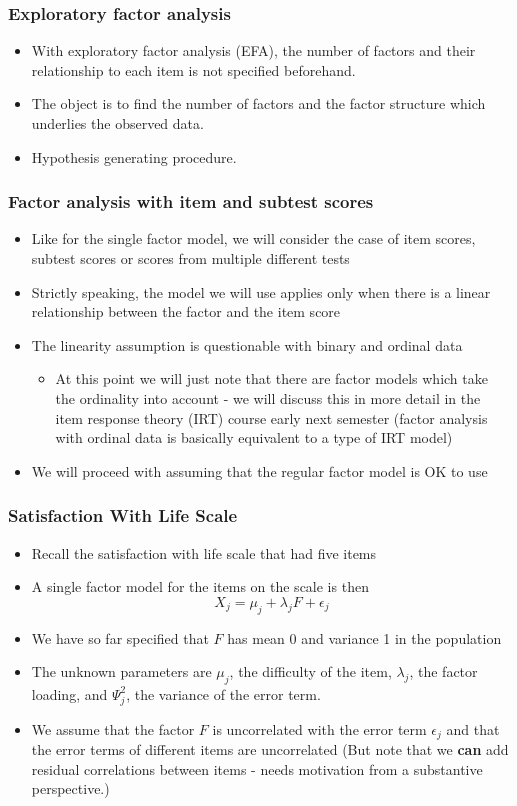 \documentclass[compress]{beamer}
\begin{document}
\begin{frame}[fragile]
\frametitle{Exploratory factor analysis}
\begin{itemize}
\item With exploratory factor analysis (EFA), the number of factors and their relationship to each item is not specified beforehand.
\item The object is to find the number of factors and the factor structure which underlies the observed data.
\item Hypothesis generating procedure.
\end{itemize}
\end{frame}

\begin{frame}[fragile]
\frametitle{Factor analysis with item and subtest scores}
\begin{itemize}
\item Like for the single factor model, we will consider the case of item scores, subtest scores or scores from multiple different tests
\item Strictly speaking, the model we will use applies only when there is a linear relationship between the factor and the item score
\item The linearity assumption is questionable with binary and ordinal data
\begin{itemize}
\item At this point we will just note that there are factor models which take the ordinality into account - we will discuss this in more detail in the item response theory (IRT) course early next semester (factor analysis with ordinal data is basically equivalent to a type of IRT model)
\end{itemize}
\item We will proceed with assuming that the regular factor model is OK to use
\end{itemize}
\end{frame}



\begin{frame}[fragile]
\frametitle{Satisfaction With Life Scale}
\begin{itemize}
\item Recall the satisfaction with life scale that had five items
\item A single factor model for the items on the scale is then
\[
X_j = \mu_j +\lambda_jF+\epsilon_j
\]
\item We have so far specified that $F$ has mean 0 and variance 1 in the population
\item The unknown parameters are $\mu_j$, the difficulty of the item, $\lambda_j$, the factor loading, and $\Psi_j^2$, the variance of the error term.
\item We assume that the factor $F$ is uncorrelated with the error term $\epsilon_j$ and that the error terms of different items are uncorrelated (But note that we \textbf{can} add residual correlations between items - needs motivation from a substantive perspective.)
\end{itemize}
\end{frame}
\end{document}

